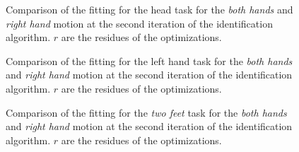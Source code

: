 \documentclass[letterpaper, 10pt, conference]{ieeeconf}      %
\begin{document}
\begin{figure}[t]
  \centering
\caption{Comparison of the fitting for the head task for the \emph{both hands} and \emph{right hand} motion at the second iteration of the identification algorithm.
$r$ are the residues of the optimizations.}
\label{fig:exp1:taskHead1}
\end{figure}

\begin{figure}[t]
  \centering
  \caption{Comparison of the fitting for the left hand task for the
    \emph{both hands} and \emph{right hand} motion at the second
    iteration of the identification algorithm.  $r$ are
    the residues of the optimizations.}
  \label{fig:exp1:taskLhand1}
\end{figure}

\begin{figure}[t]
  \centering
\caption{Comparison of the fitting for the \emph{two feet} task for the \emph{both hands} and \emph{right hand} motion at the second iteration of the identification algorithm. $r$ are the residues of the optimizations.}
\label{fig:exp1:taskTwofeet1}
\end{figure}

\end{document}

